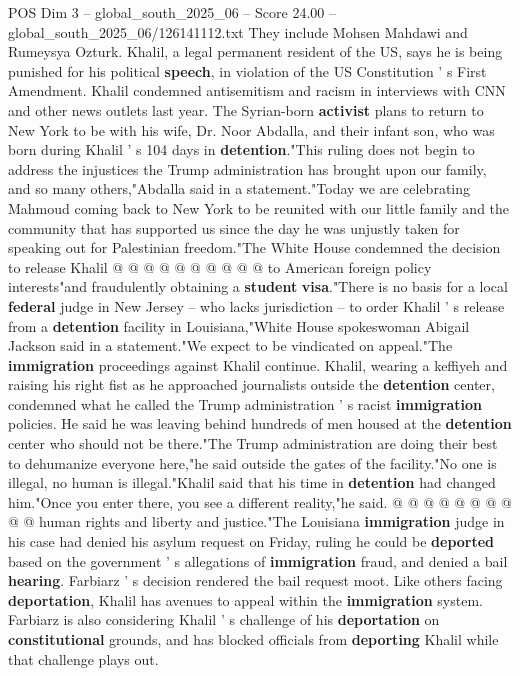 \begin{textsample}{POS Dim 3 – global\_south\_2025\_06 – Score 24.00 – global\_south\_2025\_06/126141112.txt}
They include Mohsen Mahdawi and Rumeysya Ozturk.
Khalil, a legal permanent resident of the US, says he is being punished for his political \textbf{speech}, in violation of the US Constitution ' s First Amendment.
Khalil condemned antisemitism and racism in interviews with CNN and other news outlets last year.
The Syrian-born \textbf{activist} plans to return to New York to be with his wife, Dr.
Noor Abdalla, and their infant son, who was born during Khalil ' s 104 days in \textbf{detention}."This ruling does not begin to address the injustices the Trump administration has brought upon our family, and so many others,"Abdalla said in a statement."Today we are celebrating Mahmoud coming back to New York to be reunited with our little family and the community that has supported us since the day he was unjustly taken for speaking out for Palestinian freedom."The White House condemned the decision to release Khalil @ @ @ @ @ @ @ @ @ @ to American foreign policy interests"and fraudulently obtaining a \textbf{student} \textbf{visa}."There is no basis for a local \textbf{federal} judge in New Jersey -- who lacks jurisdiction -- to order Khalil ' s release from a \textbf{detention} facility in Louisiana,"White House spokeswoman Abigail Jackson said in a statement."We expect to be vindicated on appeal."The \textbf{immigration} proceedings against Khalil continue.
Khalil, wearing a keffiyeh and raising his right fist as he approached journalists outside the \textbf{detention} center, condemned what he called the Trump administration ' s racist \textbf{immigration} policies.
He said he was leaving behind hundreds of men housed at the \textbf{detention} center who should not be there."The Trump administration are doing their best to dehumanize everyone here,"he said outside the gates of the facility."No one is illegal, no human is illegal."Khalil said that his time in \textbf{detention} had changed him."Once you enter there, you see a different reality,"he said. @ @ @ @ @ @ @ @ @ @ human rights and liberty and justice."The Louisiana \textbf{immigration} judge in his case had denied his asylum request on Friday, ruling he could be \textbf{deported} based on the government ' s allegations of \textbf{immigration} fraud, and denied a bail \textbf{hearing}.
Farbiarz ' s decision rendered the bail request moot.
Like others facing \textbf{deportation}, Khalil has avenues to appeal within the \textbf{immigration} system.
Farbiarz is also considering Khalil ' s challenge of his \textbf{deportation} on \textbf{constitutional} grounds, and has blocked officials from \textbf{deporting} Khalil while that challenge plays out.

\end{textsample}
